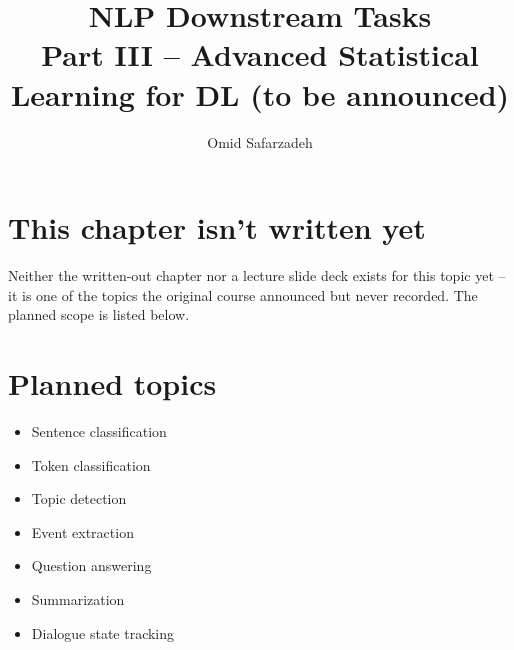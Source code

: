 \documentclass[11pt]{article}
\title{NLP Downstream Tasks \\ \large Part III -- Advanced Statistical Learning for DL (to be announced)}
\author{Omid Safarzadeh}
\date{}
\begin{document}
\maketitle

\section*{This chapter isn't written yet}
Neither the written-out chapter nor a lecture slide deck exists for this
topic yet -- it is one of the topics the original course announced but
never recorded. The planned scope is listed below.




\section*{Planned topics}
\begin{itemize}
  \item Sentence classification
  \item Token classification
  \item Topic detection
  \item Event extraction
  \item Question answering
  \item Summarization
  \item Dialogue state tracking
\end{itemize}
\end{document}
